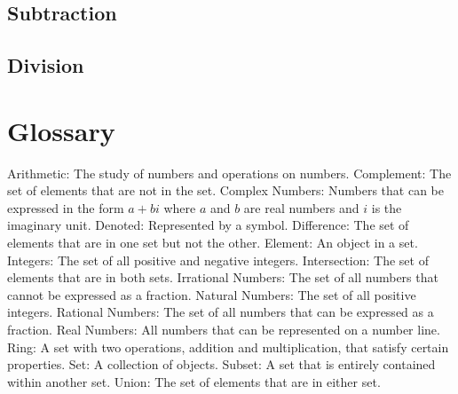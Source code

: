 \section{Subtraction}
\section{Division}



\chapter{Glossary}
Arithmetic: The study of numbers and operations on numbers.
Complement: The set of elements that are not in the set.
Complex Numbers: Numbers that can be expressed in the form $a + bi$ where $a$ and $b$ are real numbers and $i$ is the imaginary unit.
Denoted: Represented by a symbol.
Difference: The set of elements that are in one set but not the other.
Element: An object in a set.
Integers: The set of all positive and negative integers.
Intersection: The set of elements that are in both sets.
Irrational Numbers: The set of all numbers that cannot be expressed as a fraction.
Natural Numbers: The set of all positive integers.
Rational Numbers: The set of all numbers that can be expressed as a fraction.
Real Numbers: All numbers that can be represented on a number line.
Ring: A set with two operations, addition and multiplication, that satisfy certain properties.
Set: A collection of objects.
Subset: A set that is entirely contained within another set.
Union: The set of elements that are in either set.
